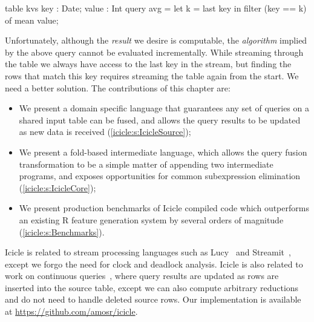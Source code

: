 \begin{icicle}
  table kvs { key : Date; value : Int }
  query avg = let k = last key
              in  filter (key == k) of mean value;
\end{icicle}

Unfortunately, although the \emph{result} we desire is computable, the \emph{algorithm} implied by the above query cannot be evaluated incrementally.
While streaming through the table we always have access to the last key in the stream, but finding the rows that match this key requires streaming the table again from the start.
We need a better solution.
The contributions of this chapter are:
\begin{itemize}
\item
  We present a domain specific language that guarantees any set of queries on a shared input table can be fused, and allows the query results to be updated as new data is received (\autoref{icicle:s:IcicleSource});

\item
  We present a fold-based intermediate language, which allows the query fusion transformation to be a simple matter of appending two intermediate programs, and exposes opportunities for common subexpression elimination (\autoref{icicle:s:IcicleCore});

\item
  We present production benchmarks of Icicle compiled code which outperforms an existing R feature generation system by several orders of magnitude (\autoref{icicle:s:Benchmarks}). 
\end{itemize}


Icicle is related to stream processing languages such as Lucy~\cite{mandel2010lucy} and Streamit~\cite{thies2002streamit}, except we forgo the need for clock and deadlock analysis.
Icicle is also related to work on continuous queries~\cite{arasu2003cql}, where query results are updated as rows are inserted into the source table, except we can also compute arbitrary reductions and do not need to handle deleted source rows.
Our implementation is available at \url{https://github.com/amosr/icicle}.
